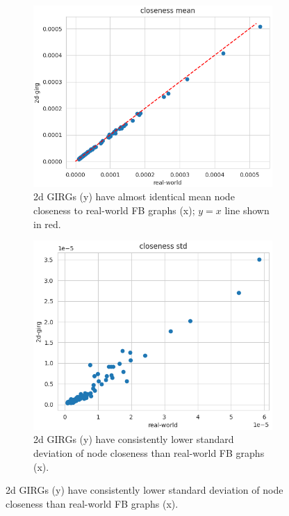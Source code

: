 \begin{figure}
    \centering
    \begin{subfigure}{0.47\textwidth}
    \includegraphics[width=\linewidth]{./figures/real_fake_closeness_mean.png}
    \caption{2d GIRGs (y) have almost identical mean node closeness to real-world FB graphs (x); $y=x$ line shown in red.}
    \label{fig:real_2d_closeness_mean_scatter}
    \end{subfigure}
    \begin{subfigure}{0.47\textwidth}
    \includegraphics[width= \linewidth]{./figures/real_fake_closeness_std.png}
    \caption{2d GIRGs (y) have consistently lower standard deviation of node closeness than real-world FB graphs (x).}
    \end{subfigure}


\end{figure}
